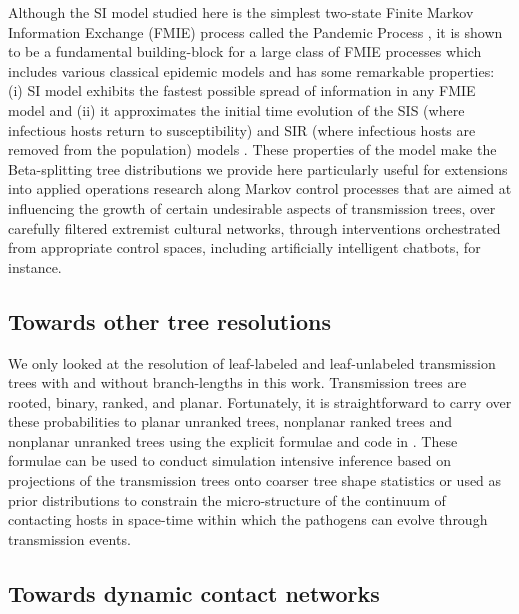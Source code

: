 \documentclass[review]{elsarticle}
\numberwithin{equation}{section}
\begin{document}
Although the SI model studied here is the simplest two-state Finite Markov Information Exchange (FMIE) process \citep[Sec.~2.2]{AldousIPSSSD2013} called the Pandemic Process \citep[Sec.~7]{AldousIPSSSD2013}, it is shown to be a fundamental building-block \citep[Sec.~3.2,7]{AldousIPSSSD2013} for a large class of FMIE processes which includes various classical epidemic models \cite[see][Sec.~8,9]{AldousIPSSSD2013} and has some remarkable properties: 
(i) SI model exhibits the fastest possible spread of information in any FMIE model \citep[Sec.~3.2]{AldousIPSSSD2013} and 
(ii) it approximates the initial time evolution of the SIS (where infectious hosts return to susceptibility) and SIR (where infectious hosts are removed from the population) models \citep[II.A]{pastor2015}.  
These properties of the model make the Beta-splitting tree distributions we provide here particularly useful for extensions into applied operations research along Markov control processes that are aimed at influencing the growth of certain undesirable aspects of transmission trees, over carefully filtered \citep{Rishal2016} extremist cultural networks, through interventions orchestrated from appropriate control spaces, including artificially intelligent chatbots, for instance.  


\subsection{Towards other tree resolutions}\label{S:D_TowardsOtherTreeResolutions}
We only looked at the resolution of leaf-labeled and leaf-unlabeled transmission trees with and without branch-lengths in this work.  
Transmission trees are rooted, binary, ranked, and planar.  
Fortunately, it is straightforward to carry over these probabilities to planar unranked trees, 
nonplanar ranked trees and nonplanar unranked trees using the explicit formulae and code in \cite{SainudiinVeber2016}.  
These formulae can be used to conduct simulation intensive inference based on projections of the transmission trees onto coarser tree shape statistics or used as prior distributions to constrain the micro-structure of the continuum of contacting hosts in space-time within which the pathogens can evolve through transmission events.

\subsection{Towards dynamic contact networks}\label{S:D_TowardsDynamicContactNetworks}
\end{document}
